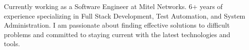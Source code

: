 

\begin{cvparagraph}

Currently working as a Software Engineer at Mitel Networks. 6+ years of experience specializing in Full Stack Development, Test Automation, and System Administration. I am passionate about finding effective solutions to difficult problems and committed to staying current with the latest technologies and tools.
\end{cvparagraph}
